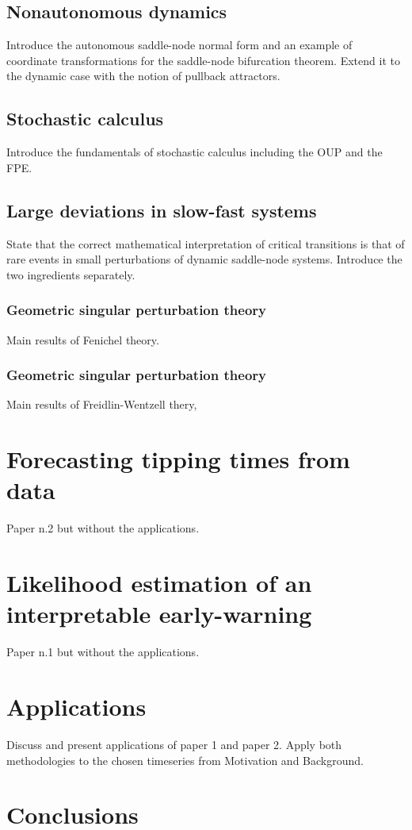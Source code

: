 \documentclass[11pt,a4paper]{article}
\theoremstyle{plain}
\theoremstyle{definition}
\theoremstyle{remark}
\begin{document}
\subsection{Nonautonomous dynamics}\label{subsec:nonautonomous}
Introduce the autonomous saddle-node normal form and an example of coordinate transformations for the saddle-node bifurcation theorem.
Extend it to the dynamic case with the notion of pullback attractors.

\subsection{Stochastic calculus}\label{subsec:stochastic}
Introduce the fundamentals of stochastic calculus including the OUP and the FPE.

\subsection{Large deviations in slow-fast systems}\label{subsec:slowfast}
State that the correct mathematical interpretation of critical transitions is that of rare events in small perturbations of dynamic saddle-node systems.
Introduce the two ingredients separately.

\subsubsection{Geometric singular perturbation theory}\label{subsubsec:gspt}
Main results of Fenichel theory.

\subsubsection{Geometric singular perturbation theory}\label{subsubsec:ldt}
Main results of Freidlin-Wentzell thery,

\section{Forecasting tipping times from data}\label{sec:forecasting}
Paper n.2 but without the applications.

\section{Likelihood estimation of an interpretable early-warning}\label{sec:interpretable}
Paper n.1 but without the applications.

\section{Applications}\label{sec:applications}
Discuss and present applications of paper 1 and paper 2.
Apply both methodologies to the chosen timeseries from Motivation and Background.

\section{Conclusions}\label{sec:conclusions}

\printbibliography
\end{document}
